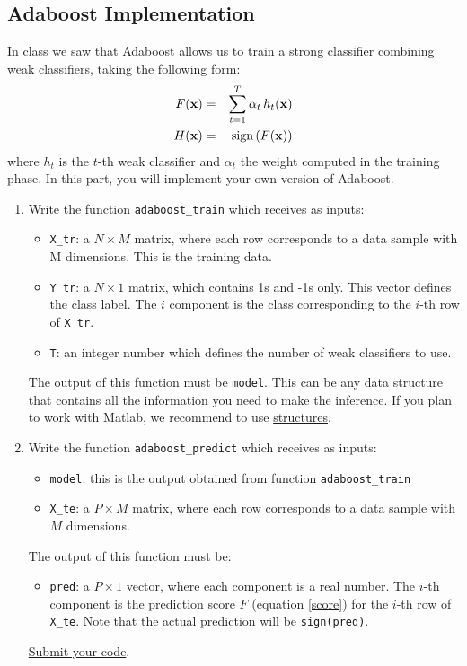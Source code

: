 \subsection{Adaboost Implementation}

In class we saw that Adaboost allows us to train a strong classifier combining weak classifiers, taking the following form:
\begin{eqnarray}
    F({\bf x}) & = & \sum_{t=1}^T \alpha_t \, h_t({\bf x}) \label{score}\\
    H({\bf x}) & = & \text{sign} \left( F({\bf x}) \right)
\end{eqnarray}
where $h_t$ is the $t$-th weak classifier and $\alpha_t$ the weight computed in the training phase. In this part, you will implement your own version of Adaboost.
\begin{enumerate}
    \item Write the function \texttt{adaboost\_train} which receives as inputs:
    \begin{itemize}
        \item \texttt{X\_tr}: a $N \times M$ matrix, where each row corresponds to a data sample with M dimensions. This is the training data.
        \item \texttt{Y\_tr}: a $N  \times 1$ matrix, which contains 1s and -1s only. This vector defines the class label. The $i$ component is the class corresponding to the $i$-th row of \texttt{X\_tr}.
        \item \texttt{T}: an integer number which defines the number of weak classifiers to use.
    \end{itemize}
    The output of this function must be \texttt{model}. This can be any data structure that contains all the information you need to make the inference. If you plan to work with Matlab, we recommend to use \href{https://www.mathworks.com/help/matlab/structures.html}{structures}.
    
    \item Write the function \texttt{adaboost\_predict} which receives as inputs:
    \begin{itemize}
        \item \texttt{model}: this is the output obtained from function \texttt{adaboost\_train}
        \item \texttt{X\_te}: a $P \times M$ matrix, where each row corresponds to a data sample with $M$ dimensions.
    \end{itemize}
    The output of this function must be:
    \begin{itemize}
        \item \texttt{pred}: a $P \times 1$ vector, where each component is a real number. The $i$-th component is the prediction score $F$ (equation \ref{score}) for the $i$-th row of \texttt{X\_te}. Note that the actual prediction will be \texttt{sign(pred)}.
    \end{itemize}
    \ul{Submit your code}.
\end{enumerate}


